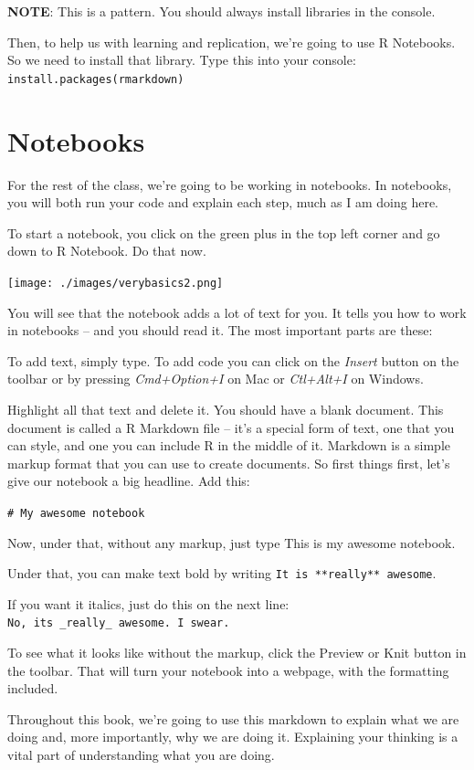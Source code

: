 \documentclass[
  letterpaper,
  DIV=11,
  numbers=noendperiod]{scrreprt}
\begin{document}
\textbf{NOTE}: This is a pattern. You should always install libraries in
the console.

Then, to help us with learning and replication, we're going to use R
Notebooks. So we need to install that library. Type this into your
console:
\texttt{install.packages(\textquotesingle{}rmarkdown\textquotesingle{})}

\hypertarget{notebooks}{%
\section{Notebooks}\label{notebooks}}

For the rest of the class, we're going to be working in notebooks. In
notebooks, you will both run your code and explain each step, much as I
am doing here.

To start a notebook, you click on the green plus in the top left corner
and go down to R Notebook. Do that now.

\texttt{[image: ./images/verybasics2.png]}

You will see that the notebook adds a lot of text for you. It tells you
how to work in notebooks -- and you should read it. The most important
parts are these:

To add text, simply type. To add code you can click on the \emph{Insert}
button on the toolbar or by pressing \emph{Cmd+Option+I} on Mac or
\emph{Ctl+Alt+I} on Windows.

Highlight all that text and delete it. You should have a blank document.
This document is called a R Markdown file -- it's a special form of
text, one that you can style, and one you can include R in the middle of
it. Markdown is a simple markup format that you can use to create
documents. So first things first, let's give our notebook a big
headline. Add this:

\texttt{\#\ My\ awesome\ notebook}

Now, under that, without any markup, just type This is my awesome
notebook.

Under that, you can make text bold by writing
\texttt{It\ is\ **really**\ awesome}.

If you want it italics, just do this on the next line:
\texttt{No,\ it\textquotesingle{}s\ \_really\_\ awesome.\ I\ swear.}

To see what it looks like without the markup, click the Preview or Knit
button in the toolbar. That will turn your notebook into a webpage, with
the formatting included.

Throughout this book, we're going to use this markdown to explain what
we are doing and, more importantly, why we are doing it. Explaining your
thinking is a vital part of understanding what you are doing.
\end{document}
